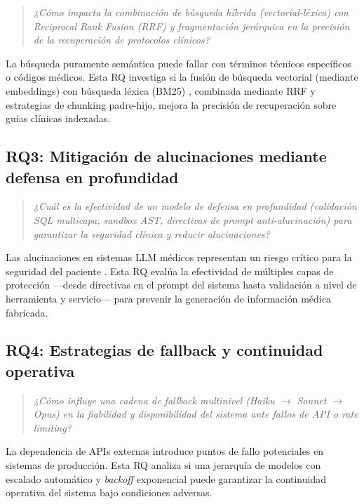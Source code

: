 \begin{quote}
\textit{¿Cómo impacta la combinación de búsqueda híbrida (vectorial-léxica) con Reciprocal Rank Fusion (\acs{RRF}) y fragmentación jerárquica en la precisión de la recuperación de protocolos clínicos?}
\end{quote}

La búsqueda puramente semántica puede fallar con términos técnicos específicos o códigos médicos. Esta \ac{RQ} investiga si la fusión de búsqueda vectorial (mediante embeddings) con búsqueda léxica (\ac{BM25}) \parencite{robertson2009bm25}, combinada mediante \ac{RRF} \parencite{cormack2009rrf} y estrategias de chunking padre-hijo, mejora la precisión de recuperación sobre guías clínicas indexadas.

\subsection{RQ3: Mitigación de alucinaciones mediante defensa en profundidad}

\begin{quote}
\textit{¿Cuál es la efectividad de un modelo de defensa en profundidad (validación \ac{SQL} multicapa, sandbox \ac{AST}, directivas de prompt anti-alucinación) para garantizar la seguridad clínica y reducir alucinaciones?}
\end{quote}

Las alucinaciones en sistemas \ac{LLM} médicos representan un riesgo crítico para la seguridad del paciente \parencite{kim2025hallucination,farquhar2024semantic}. Esta \ac{RQ} evalúa la efectividad de múltiples capas de protección ---desde directivas en el prompt del sistema hasta validación a nivel de herramienta y servicio--- para prevenir la generación de información médica fabricada.

\subsection{RQ4: Estrategias de fallback y continuidad operativa}

\begin{quote}
\textit{¿Cómo influye una cadena de fallback multinivel (Haiku $\rightarrow$ Sonnet $\rightarrow$ Opus) en la fiabilidad y disponibilidad del sistema ante fallos de \ac{API} o rate limiting?}
\end{quote}

La dependencia de APIs externas introduce puntos de fallo potenciales en sistemas de producción. Esta \ac{RQ} analiza si una jerarquía de modelos con escalado automático y \textit{backoff} exponencial puede garantizar la continuidad operativa del sistema bajo condiciones adversas.


